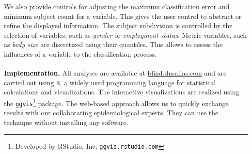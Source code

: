 \documentclass[a4paper,twoside]{style/article}
\begin{document}
We also provide controls for adjusting the maximum classification error and minimum subject count for a variable.
This gives the user control to abstract or refine the displayed information.
The subject subdivision is controlled by the selection of variables, such as \emph{gender} or \emph{employment status}.
Metric variables, such as \emph{body size} are discretized using their quantiles.
This allows to assess the influences of a variable to the classification process.
\\\\
\noindent \textbf{Implementation.}
All analyses are available at \url{blind.dnsalias.com} and are carried out using \texttt{R}, a widely used programming language for statistical calculations and visualizations.
The interactive visualizations are realized using the \texttt{ggvis}\footnote{Developed by RStudio, Inc; \texttt{ggvis.rstudio.com}} package.
The web-based approach allows us to quickly exchange results with our collaborating epidemiological experts.
They can use the technique without installing any software.
\end{document}
